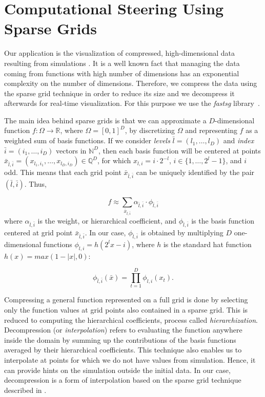 \section{Computational Steering Using Sparse Grids}
\label{sec:comp_steering}

Our application is the visualization of compressed, high-dimensional data
resulting from simulations \cite{Butnaru201156}. It is a well known fact that
managing the data coming from functions with high number of dimensions has an
exponential complexity on the number of dimensions. Therefore, we compress the
data using the sparse grid technique in order to reduce its size and we
decompress it afterwards for real-time visualization. For this purpose we use
the \textit{fastsg} library~\cite{murarasu12fastsg:}.

The main idea behind sparse grids is that we can approximate a $D$-dimensional
function $f : \Omega \rightarrow \mathbb{R}$, where $\Omega = [0, 1]^{D}$, by
discretizing $\Omega$ and representing $f$ as a weighted sum of basis functions.
If we consider \textit{levels} $\bar{l} = (l_{1},\ldots,l_{D})$ and
\textit{index} $\bar{i} = (i_{1},\ldots,i_{D})$ vectors in $\mathbb{N}^{D}$,
then each basis function will be centered at points $\bar{x}_{\bar{l},\bar{i}} =
(x_{l_{1},i_{1}},\ldots,x_{l_{D},i_{D}}) \in \mathbb{Q}^{D}$, for which $x_{l,i}
= i \cdot 2^{-l}$, $i \in \{1,\ldots,2^{l} - 1\}$, and $i$ odd. This means that
each grid point $\bar{x}_{\bar{l},\bar{i}}$ can be uniquely identified by the
pair $(\bar{l},\bar{i})$. Thus,

\[ f \approx \sum_{\bar{x}_{\bar{l},\bar{i}}} \alpha_{\bar{l},\bar{i}} \cdot
\phi_{\bar{l},\bar{i}} \]
where $\alpha_{\bar{l},\bar{i}}$ is the weight, or hierarchical coefficient, and
$\phi_{\bar{l},\bar{i}}$ is the basis function centered at grid point
$\bar{x}_{\bar{l},\bar{i}}$. In our case, $\phi_{\bar{l},\bar{i}}$ is obtained
by multiplying $D$ one-dimensional functions $\phi_{l,i} = h(2^{l}x - i)$, where
$h$ is the standard hat function $h(x) = max(1 - |x|, 0)$:

\[ \phi_{\bar{l},\bar{i}}(\bar{x}) = \prod_{t=1}^{D} \phi_{l,i}(x_{t}) .\]

Compressing a general function represented on a full grid is done by selecting
only the function values at grid points also contained in a sparse grid. This is
reduced to computing the hierarchical coefficients, process called
\textit{hierarchization}. Decompression (or \textit{interpolation}) refers to
evaluating the function anywhere inside the domain by summing up the
contributions of the basis functions averaged by their hierarchical
coefficients. This technique also enables us to interpolate at points for which
we do not have values from simulation. Hence, it can provide hints on the
simulation outside the initial data. In our case, decompression is a form of
interpolation based on the sparse grid technique described in
\cite{CambridgeJournals:227245}.

